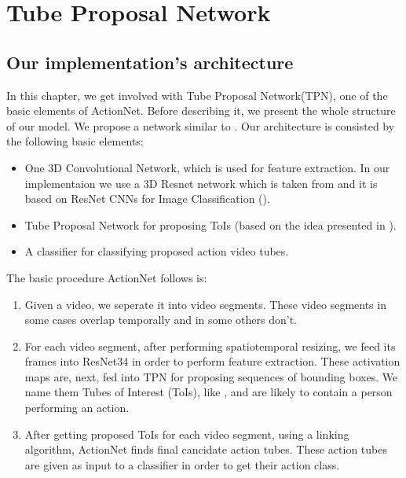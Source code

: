 


% 

\chapter{Tube Proposal Network}

\section{ Our implementation's architecture}
In this chapter, we get involved with Tube Proposal Network(TPN), one of the basic elements of ActionNet. Before describing it, we present
the whole structure of our model. We propose a network similar to \cite{DBLP:journals/corr/HouCS17}.
Our architecture is consisted by the following basic elements:
\begin{itemize}
\item One 3D Convolutional Network, which is used for feature extraction. In our implementaion we use a 3D Resnet network which is taken from
  \cite{hara3dcnns} and it is based on ResNet CNNs for Image Classification (\cite{DBLP:journals/corr/HeZRS15}).
\item Tube Proposal Network for proposing ToIs (based on the idea presented in \cite{DBLP:journals/corr/HouCS17}).
\item A classifier for classifying proposed action video tubes.
\end{itemize}

The basic procedure ActionNet follows is:
\begin{enumerate}
\item Given a video, we seperate it into video segments. These video segments in some cases overlap temporally and in some others don't.
\item For each video segment, after performing spatiotemporal resizing, we feed its frames into ResNet34 in order to perform feature
  extraction. These activation maps are, next, fed into TPN for proposing sequences of bounding boxes. We name them Tubes of Interest (ToIs), 
  like \cite{DBLP:journals/corr/HouCS17}, and are likely to contain a person performing an action.
\item After getting proposed ToIs for each video segment, using a linking algorithm, ActionNet finds final cancidate action tubes. These
  action tubes are given as input to a classifier in order to get their action class.
\end{enumerate}

